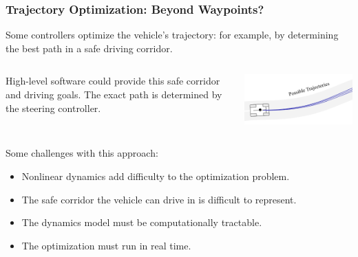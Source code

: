 \documentclass{beamer}
\begin{document}
\begin{frame}
\frametitle{Trajectory Optimization: Beyond Waypoints?}
Some controllers optimize the vehicle's trajectory: for example, by determining the best path in a safe driving corridor.
\vspace{1em}
\begin{columns}
	\begin{column}{0.6\linewidth}
High-level software could provide this safe corridor and driving goals. The exact path is determined by the steering controller.
	\end{column}
	\begin{column}{0.3\linewidth}
	\includegraphics[width=1.0\linewidth]{figures/many_trajectories.png}
\end{column}
\end{columns}
\vspace{1em}

Some challenges with this approach:
\begin{itemize}
	\item Nonlinear dynamics add difficulty to the optimization problem.
	\item The safe corridor the vehicle can drive in is difficult to represent.
	\item The dynamics model must be computationally tractable.
	\item The optimization must run in real time.
\end{itemize}
\end{frame}
\end{document}
